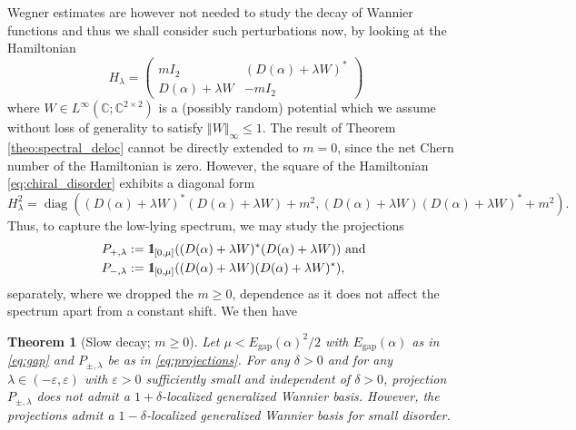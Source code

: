 \documentclass[reqno,12pt,letterpaper]{amsart}
\newcommand{\CC}{{\mathbb C}}
\newtheorem{theo}{Theorem}
\numberwithin{equation}{section}
\def\indic{\operatorname{1\hskip-2.75pt\relax l}}
\begin{document}
Wegner estimates are however not needed to study the decay of Wannier functions and thus we shall consider such perturbations now, by looking at the Hamiltonian
\begin{equation}
\label{eq:chiral_disorder}
H_{\lambda} = \begin{pmatrix} m I_2 & (D(\alpha) + \lambda W)^*\\  D(\alpha) + \lambda W & -m I_2 \end{pmatrix}
\end{equation}
where $W  \in L^{\infty}(\CC;\CC^{2\times 2})$ is a (possibly random) potential which we assume without loss of generality to satisfy $\Vert W \Vert_{\infty}\le 1.$
The result of Theorem \ref{theo:spectral_deloc} cannot be directly extended to $m=0$, since the net Chern number of the Hamiltonian is zero. However, the square of the Hamiltonian \eqref{eq:chiral_disorder} exhibits a diagonal form 
\begin{equation}
\label{eq:chiral_disorder_square}
H_{\lambda}^2 = \operatorname{diag}( (D(\alpha) + \lambda W)^*(D(\alpha) + \lambda W)+m^2,(D(\alpha) + \lambda W)(D(\alpha) + \lambda W)^*+m^2).
\end{equation}
Thus, to capture the low-lying spectrum, we may study the projections 
\begin{equation}
\label{eq:projections}
\begin{split}
P_{+,\lambda} &:= \indic_{[0,\mu]}((D(\alpha) + \lambda W)^*(D(\alpha) + \lambda W)) \text{ and } \\
P_{-,\lambda} &:=\indic_{[0,\mu]}((D(\alpha) + \lambda W)(D(\alpha) + \lambda W)^*), 
\end{split}
\end{equation}
separately, where we dropped the $m \ge 0$, dependence as it does not affect the spectrum apart from a constant shift. We then have
\begin{theo}[Slow decay; $m\ge 0$]
\label{theo:spectral_deloc2}
Let $\mu<E_{\operatorname{gap}}(\alpha)^2/2$ with $E_{\operatorname{gap}}(\alpha)$ as in \eqref{eq:gap} and $P_{\pm,\lambda}$ be as in \eqref{eq:projections}. For any $\delta>0$ and for any $\lambda \in (-\varepsilon,\varepsilon)$ with $\varepsilon>0$ sufficiently small and independent of $\delta>0$, projection $P_{\pm,\lambda}$ does not admit a $1+\delta$-localized generalized Wannier basis. However, the projections admit a $1-\delta$-localized generalized Wannier basis for small disorder. 
\end{theo}
\end{document}
